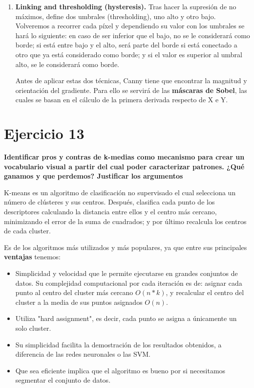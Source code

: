 \documentclass[11pt,a4paper]{article}
\begin{document}
\begin{enumerate}
	\item \textbf{Linking and thresholding (hysteresis).} Tras hacer la supresión de no máximos, define dos umbrales (thresholding), uno alto
	y otro bajo. Volveremos a recorrer cada píxel y dependiendo su valor con los umbrales se hará lo siguiente: en caso de ser inferior que el
	bajo, no se le considerará como borde; si está entre bajo y el alto, será parte del borde si está conectado a otro que ya está considerado
	como borde; y si el valor es superior al umbral alto, se le considerará como borde.

	Antes de aplicar estas dos técnicas, Canny tiene que encontrar la magnitud y orientación del gradiente. Para ello se servirá de las
	\textbf{máscaras de Sobel}, las cuales se basan en el cálculo de la primera derivada respecto de X e Y.

\end{enumerate}


\section*{Ejercicio 13}

\textbf{Identificar pros y contras de k-medias como mecanismo para crear un vocabulario visual a partir del cual poder caracterizar patrones.
¿Qué ganamos y que perdemos? Justificar los argumentos}

K-means es un algoritmo de clasificación no supervisado el cual selecciona un número de clústeres y sus centros. Después, clasifica cada punto
de los descriptores calculando la distancia entre ellos y el centro más cercano, minimizando el error de la suma de cuadrados; y por último
recalcula los centros de cada cluster.

Es de los algoritmos más utilizados y más populares, ya que entre sus principales \textbf{ventajas} tenemos:
\begin{itemize}
	\item Simplicidad y velocidad que le permite ejecutarse en grandes conjuntos de datos. Su complejidad computacional por cada iteración es
	de: asignar cada punto al centro del cluster más cercano $O(n*k)$, y recalcular el centro del cluster a la media de sus puntos asignados $O(n)$.
	\item Utiliza "hard assignment", es decir, cada punto se asigna a únicamente un solo cluster.
	\item Su simplicidad facilita la demostración de los resultados obtenidos, a diferencia de las redes neuronales o las SVM.
	\item Que sea eficiente implica que el algoritmo es bueno por si necesitamos segmentar el conjunto de datos.
\end{itemize}
\end{document}
